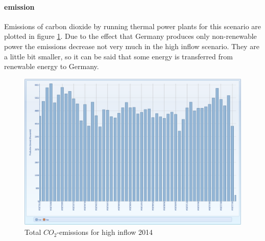 \documentclass{article}
\begin{document}
\paragraph{emission\\}
Emissions of carbon dioxide by running thermal power plants for this scenario are plotted in figure \ref{fig:MTemissionswet}. Due to the effect that Germany produces only non-renewable power the emissions decrease not very much in the high inflow scenario. They are a little bit smaller, so it can be said that some energy is transferred from renewable energy to Germany. 
\begin{figure}[htbp]
\begin{center}
\includegraphics[width=13cm,keepaspectratio=true]{figures/wetcase/MTCO2wet}
\caption{Total $CO_2$-emissions for high inflow 2014}
\label{fig:MTemissionswet}
\end{center}
\end{figure}
\end{document}
